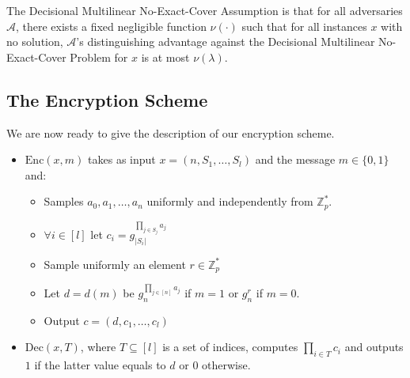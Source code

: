 \documentclass[12pt]{tufte-book}
\begin{document}
The Decisional Multilinear No-Exact-Cover Assumption is that for all adversaries $\mathcal{A}$, there exists a fixed negligible function $\nu(\cdot)$ such that for all instances $x$ with no solution, $\mathcal{A}$'s distinguishing advantage against the Decisional Multilinear No-Exact-Cover Problem  for $x$ is at most $\nu(\lambda)$.

\subsection{The Encryption Scheme  }

We are now ready to give the description of our encryption scheme.

\begin{itemize}

\item $\mathrm{Enc}(x,m)$ takes as input $x=(n, S_1, \ldots,S_l)$ and the message $m \in \{0,1\}$ and:

\begin{itemize}

\item Samples $a_{0}, a_1, \ldots, a_{n}$ uniformly and independently from $\mathbb{Z}_p^*$.

\item $\forall i \in [l]$ let $c_i = g^{\prod_{j\in S_j} a_j}_{|S_i|}$

\item Sample uniformly an element $r \in \mathbb{Z}_p^*$

\item Let $d = d(m) $ be $  g_n^{\prod_{j \in [n]}a_j}$ if $m = 1 $ or $g_n^r$ if $m = 0$.

\item Output $c = (d, c_1, \ldots,c_l)$
\end{itemize}

\item $\mathrm{Dec}(x,T)$, where $T \subseteq[l]$ is a set of indices, computes $\prod_{i \in T}c_i$ and outputs $1$ if the latter value equals to $d$ or $0$ otherwise.

\end{itemize}
\end{document}
